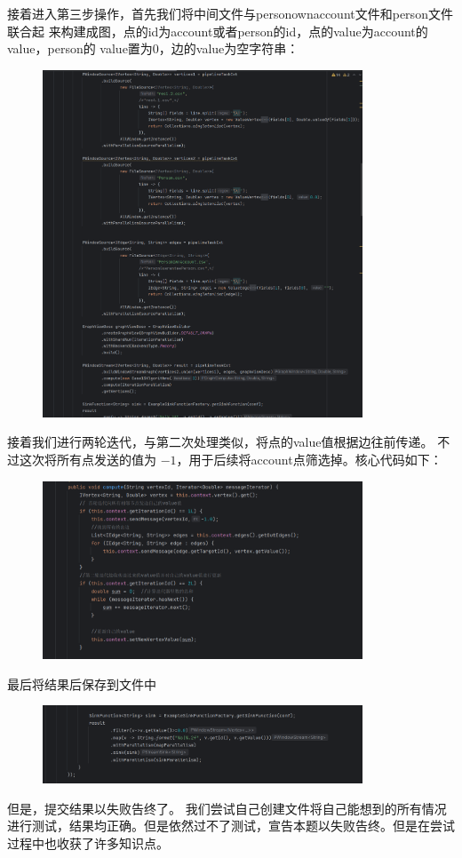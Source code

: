 接着进入第三步操作，首先我们将中间文件与personownaccount文件和person文件联合起
来构建成图，点的id为account或者person的id，点的value为account的value，person的
value置为0，边的value为空字符串：
\begin{figure}[H]
  \begin{center}
    \includegraphics[width=0.85\textwidth,scale=0.7]{./figures/pro4/7.png}
  \end{center}
\end{figure}

接着我们进行两轮迭代，与第二次处理类似，将点的value值根据边往前传递。
不过这次将所有点发送的值为 $ -1 $，用于后续将account点筛选掉。核心代码如下：
\begin{figure}[H]
  \begin{center}
    \includegraphics[width=0.85\textwidth,scale=0.7]{./figures/pro4/8.png}
  \end{center}
\end{figure}

最后将结果后保存到文件中
\begin{figure}[H]
  \begin{center}
    \includegraphics[width=0.85\textwidth,scale=0.7]{./figures/pro4/9.png}
  \end{center}
\end{figure}

但是，提交结果以失败告终了。
我们尝试自己创建文件将自己能想到的所有情况进行测试，结果均正确。但是依然过不了测试，宣告本题以失败告终。但是在尝试过程中也收获了许多知识点。
